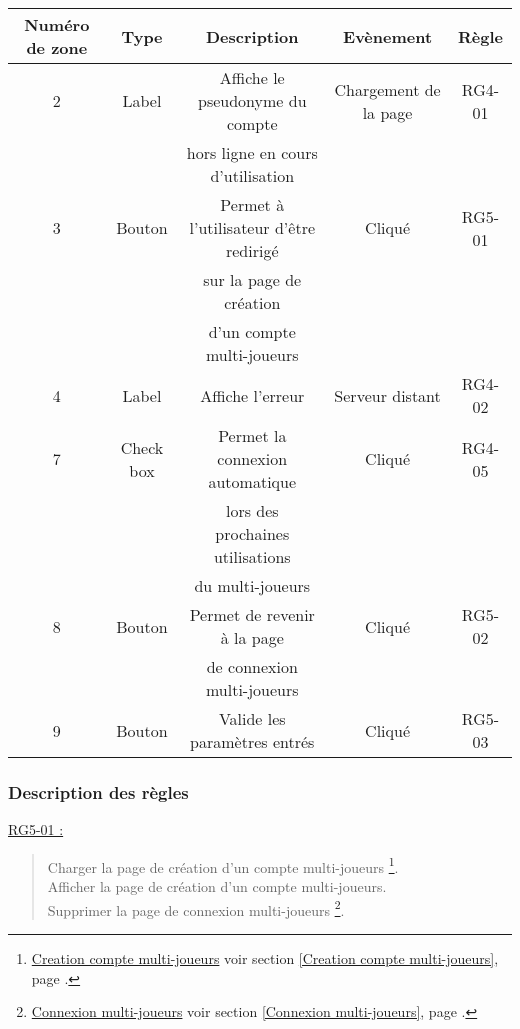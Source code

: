 \documentclass{report}
\begin{document}
			\begin{tabular}{|c|c|c|c|c|} \hline
				Numéro de zone & Type  & Description & Evènement &	Règle \\\hline
				2 & Label & Affiche le pseudonyme du compte & Chargement de la page & RG4-01 \\
				  &       & hors ligne en cours d'utilisation & & \\\hline
				3 & Bouton & Permet à l'utilisateur d'être redirigé & Cliqué & RG5-01\\
				  &        & sur la page de création  & & \\
				  &        & d'un compte multi-joueurs \footnotemark[1] & & \\\hline
				4 & Label & Affiche l'erreur & Serveur distant & RG4-02 \\\hline
				7 & Check box & Permet la connexion automatique & Cliqué & RG4-05 \\
				  &           & lors des prochaines utilisations&        & \\				
				  &           & du multi-joueurs                &        & \\\hline
				8 & Bouton & Permet de revenir à la page & Cliqué & RG5-02 \\
				  &        & de connexion multi-joueurs \footnotemark[2] & & \\\hline
				9 & Bouton & Valide les paramètres entrés & Cliqué & RG5-03 \\\hline
			\end{tabular}
			
		\subsubsection{Description des règles}

			\underline{RG5-01 :}
				\begin{quote}
					Charger la page de création d'un compte multi-joueurs%
						\footnote[1]{
							\hyperlink{Creation compte multi-joueurs}{Creation compte multi-joueurs}
							\og voir section \ref{Creation compte multi-joueurs}, page \pageref{Creation compte multi-joueurs}.\fg
						}.\\
					Afficher la page de création d'un compte multi-joueurs\footnotemark[1].\\
					Supprimer la page de connexion multi-joueurs%
						\footnote[2]{
							\hyperlink{Connexion multi-joueurs}{Connexion multi-joueurs}
							\og voir section \ref{Connexion multi-joueurs}, page \pageref{Connexion multi-joueurs}.\fg
						}.\\
				\end{quote}	
\end{document}
